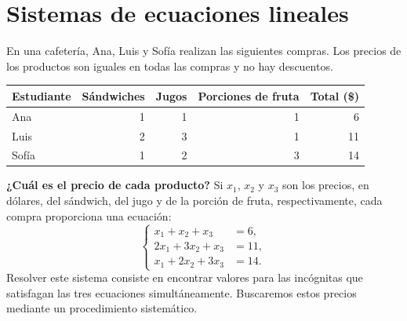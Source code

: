 \documentclass[compacto,10pt]{pubciencias-notas}
\begin{document}
\encabezado

\vspace{-8mm}

\section{Sistemas de ecuaciones lineales}

\begin{ejem}\label{ej:sistema}
En una cafetería, Ana, Luis y Sofía realizan las siguientes compras.
Los precios de los productos son iguales en todas las compras y no hay descuentos.
\begin{center}
\begin{tabular}{lrrrr}
\hline
Estudiante & Sándwiches & Jugos & Porciones de fruta & Total (\$)\\
\hline
Ana & 1 & 1 & 1 & 6\\
Luis & 2 & 3 & 1 & 11\\
Sofía & 1 & 2 & 3 & 14\\
\hline
\end{tabular}
\end{center}
\textbf{¿Cuál es el precio de cada producto?}
Si $x_1$, $x_2$ y $x_3$ son los precios, en dólares, del sándwich, del jugo
y de la porción de fruta, respectivamente, cada compra proporciona una ecuación:
\[
\left\{\begin{aligned}
x_1+x_2+x_3&=6,\\
2x_1+3x_2+x_3&=11,\\
x_1+2x_2+3x_3&=14.
\end{aligned}\right.
\]
Resolver este sistema consiste en encontrar valores para las incógnitas que
satisfagan las tres ecuaciones simultáneamente.
Buscaremos estos precios mediante un procedimiento sistemático.
\end{ejem}
\end{document}
